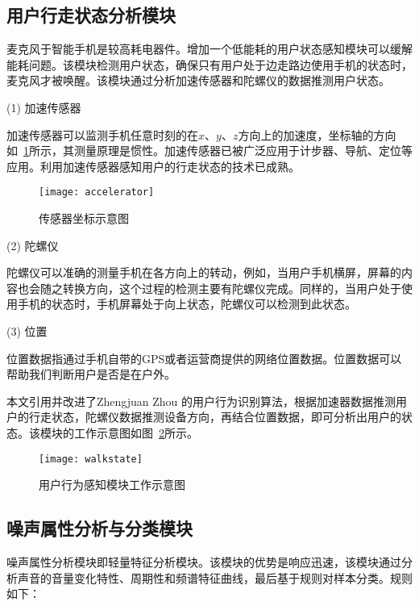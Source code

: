 \subsection{用户行走状态分析模块}

麦克风于智能手机是较高耗电器件。增加一个低能耗的用户状态感知模块可以缓解能耗问题。该模块检测用户状态，确保只有用户处于边走路边使用手机的状态时，麦克风才被唤醒。该模块通过分析加速传感器和陀螺仪的数据推测用户状态。

(1)	加速传感器

加速传感器可以监测手机任意时刻的在$x、y、z$方向上的加速度，坐标轴的方向如~\ref{fig:accelerator}所示，其测量原理是惯性。加速传感器已被广泛应用于计步器、导航、定位等应用。利用加速传感器感知用户的行走状态的技术已成熟。

\begin{figure}[htbp] %
  \centering
  \texttt{[image: accelerator]}
  \caption{传感器坐标示意图}
  \label{fig:accelerator}
\end{figure}



(2)	陀螺仪

陀螺仪可以准确的测量手机在各方向上的转动，例如，当用户手机横屏，屏幕的内容也会随之转换方向，这个过程的检测主要有陀螺仪完成。同样的，当用户处于使用手机的状态时，手机屏幕处于向上状态，陀螺仪可以检测到此状态。

(3) 位置

位置数据指通过手机自带的GPS或者运营商提供的网络位置数据。位置数据可以帮助我们判断用户是否是在户外。


本文引用并改进了Zhengjuan Zhou 的用户行为识别算法，根据加速器数据推测用户的行走状态，陀螺仪数据推测设备方向，再结合位置数据，即可分析出用户的状态。该模块的工作示意图如图~\ref{fig:walkstate}所示。

\begin{figure}[htbp] %
  \centering
  \texttt{[image: walkstate]}
  \caption{用户行为感知模块工作示意图}
  \label{fig:walkstate}
\end{figure}


\subsection{噪声属性分析与分类模块}

噪声属性分析模块即轻量特征分析模块。该模块的优势是响应迅速，该模块通过分析声音的音量变化特性、周期性和频谱特征曲线，最后基于规则对样本分类。规则如下：

